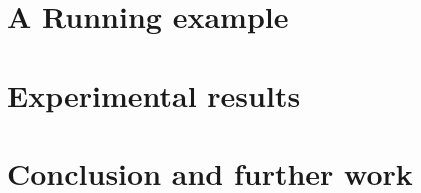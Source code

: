 \documentclass{llncs}
\begin{document}


\section{A Running example \label{sec:proof}}



\section{Experimental results\label{sec:experiences}}



\section{Conclusion and further work\label{sec:conclusion}}



 


\end{document}
